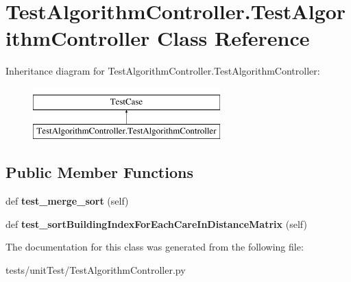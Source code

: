 \hypertarget{class_test_algorithm_controller_1_1_test_algorithm_controller}{}\section{Test\+Algorithm\+Controller.\+Test\+Algorithm\+Controller Class Reference}
\label{class_test_algorithm_controller_1_1_test_algorithm_controller}
Inheritance diagram for Test\+Algorithm\+Controller.\+Test\+Algorithm\+Controller\+:\begin{figure}[H]
\begin{center}
\leavevmode
\includegraphics[height=2.000000cm]{class_test_algorithm_controller_1_1_test_algorithm_controller}
\end{center}
\end{figure}
\subsection*{Public Member Functions}
\begin{DoxyCompactItemize}
\item 
\mbox{\label{class_test_algorithm_controller_1_1_test_algorithm_controller_a80501ce09022359dc79254b6439a468b}} 
def {\bfseries test\+\_\+merge\+\_\+sort} (self)
\item 
\mbox{\label{class_test_algorithm_controller_1_1_test_algorithm_controller_a637e7050ee760c6fd7d6b6a8b0a3a034}} 
def {\bfseries test\+\_\+sort\+Building\+Index\+For\+Each\+Care\+In\+Distance\+Matrix} (self)
\end{DoxyCompactItemize}


The documentation for this class was generated from the following file\+:\begin{DoxyCompactItemize}
\item 
tests/unit\+Test/Test\+Algorithm\+Controller.\+py\end{DoxyCompactItemize}
